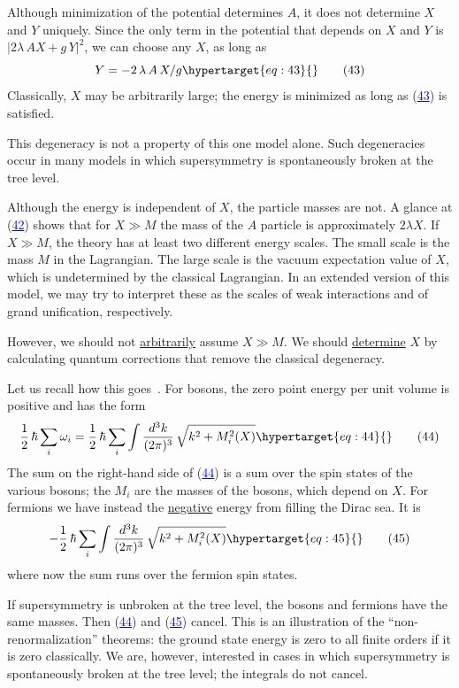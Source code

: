 \documentclass[11pt,a4paper]{article}
\newcommand{\eqtarget}[1]{\hypertarget{eq:#1}{\mathstrut}\tag{#1}}
\newcommand{\eqnref}[1]{(\hyperlink{eq:#1}{\textcolor{blue}{#1}})}
\begin{document}
Although minimization of the potential determines $A$, it does not
determine $X$ and $Y$ uniquely. Since the only term in the potential that
depends on $X$ and $Y$ is $|2 \lambda\, A X + g\, Y|^2$, we can choose any $X$, as long as
\begin{equation}
Y = -2\, \lambda\, A\, X / g
\eqtarget{43}
\end{equation}
Classically, $X$ may be arbitrarily large; the energy is minimized as
long as \eqnref{43} is satisfied.

This degeneracy is not a property of this one model alone.
Such degeneracies occur in many models in which supersymmetry is
spontaneously broken at the tree level.

Although the energy is independent of $X$, the particle masses
are not. A glance at \eqnref{42} shows that for $X \gg M$ the mass of the $A$
particle is approximately $2 \lambda X$. If $X \gg M$, the theory has at least
two different energy scales. The small scale is the mass $M$ in the
Lagrangian. The large scale is the vacuum expectation value of $X$,
which is undetermined by the classical Lagrangian. In an extended
version of this model, we may try to interpret these as the scales
of weak interactions and of grand unification, respectively.

However, we should not \underline{arbitrarily} assume $X \gg M$. We should
\underline{determine} $X$ by calculating quantum corrections that remove the classical
degeneracy.

Let us recall how this goes~\cite{ref15}. For bosons, the zero point
energy per unit volume is positive and has the form
\begin{equation}
\frac{1}{2}\,\hbar \sum_i \omega_i = \frac{1}{2}\,\hbar \sum_i \int \frac{d^3 k}{(2\pi)^3}\, \sqrt{k^2 + M_i^2(X)}
\eqtarget{44}
\end{equation}
The sum on the right-hand side of \eqnref{44} is a sum over the spin states
of the various bosons; the $M_i$ are the masses of the bosons, which
depend on $X$. For fermions we have instead the \underline{negative} energy from
filling the Dirac sea. It is
\begin{equation}
- \frac{1}{2}\,\hbar \sum_i \int \frac{d^3 k}{(2\pi)^3}\, \sqrt{k^2 + M_i^2(X)}
\eqtarget{45}
\end{equation}
where now the sum runs over the fermion spin states.

If supersymmetry is unbroken at the tree level, the bosons and
fermions have the same masses. Then \eqnref{44} and \eqnref{45} cancel. This is
an illustration of the ``non-renormalization'' theorems: the ground
state energy is zero to all finite orders if it is zero classically.
We are, however, interested in cases in which supersymmetry is
spontaneously broken at the tree level; the integrals do not cancel.
\end{document}
